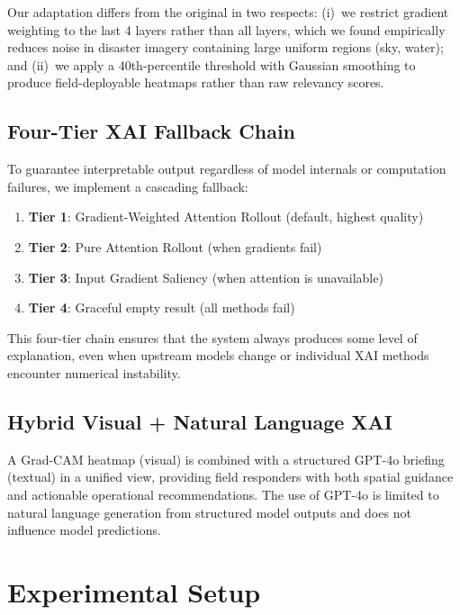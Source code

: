 \documentclass[journal]{IEEEtran}
\begin{document}
Our adaptation differs from the original in two respects: (i)~we restrict gradient weighting to the last 4 layers rather than all layers, which we found empirically reduces noise in disaster imagery containing large uniform regions (sky, water); and (ii)~we apply a 40th-percentile threshold with Gaussian smoothing to produce field-deployable heatmaps rather than raw relevancy scores.

\subsection{Four-Tier XAI Fallback Chain}

To guarantee interpretable output regardless of model internals or computation failures, we implement a cascading fallback:

\begin{enumerate}
    \item \textbf{Tier 1}: Gradient-Weighted Attention Rollout (default, highest quality)
    \item \textbf{Tier 2}: Pure Attention Rollout (when gradients fail)
    \item \textbf{Tier 3}: Input Gradient Saliency (when attention is unavailable)
    \item \textbf{Tier 4}: Graceful empty result (all methods fail)
\end{enumerate}

This four-tier chain ensures that the system always produces some level of explanation, even when upstream models change or individual XAI methods encounter numerical instability.

\subsection{Hybrid Visual + Natural Language XAI}

A Grad-CAM heatmap (visual) is combined with a structured GPT-4o briefing (textual) in a unified view, providing field responders with both spatial guidance and actionable operational recommendations. The use of GPT-4o is limited to natural language generation from structured model outputs and does not influence model predictions.

\section{Experimental Setup}
\end{document}
